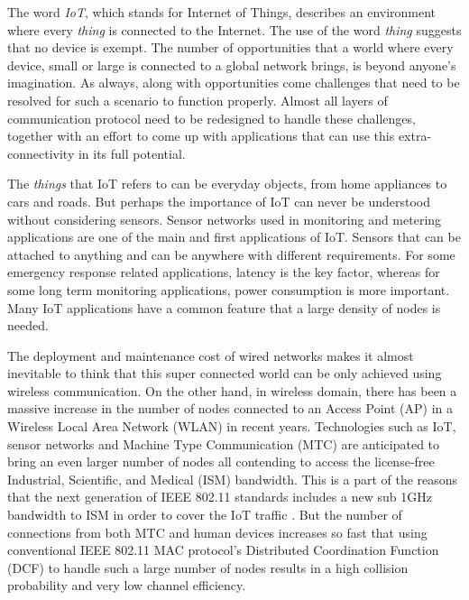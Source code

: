 \label{chapter:introduction}

The word \textit{IoT}, which stands for Internet of Things, describes an environment where every \textit{thing} is connected to the Internet. The use of the word \textit{thing} suggests that no device is exempt. The number of opportunities that a world where every device, small or large is connected to a global network brings, is beyond anyone's imagination. As always, along with opportunities come challenges that need to be resolved for such a scenario to function properly. Almost all layers of communication protocol need to be redesigned to handle these challenges, together with an effort to come up with applications that can use this extra-connectivity in its full potential.

The \textit{things} that IoT refers to can be everyday objects, from home appliances to cars and roads. But perhaps the importance of IoT can never be understood without considering sensors. Sensor networks used in monitoring and metering applications are one of the main and first applications of IoT. Sensors that can be attached to anything and can be anywhere with different requirements. For some emergency response related applications, latency is the key factor, whereas for some long term monitoring applications, power consumption is more important. Many IoT applications have a common feature that a large density of nodes is needed.


The deployment and maintenance cost of wired networks makes it almost inevitable to think that this super connected world can be only achieved using wireless communication. On the other hand, in wireless domain, there has been a massive increase in the number of nodes connected to an Access Point (AP) in a Wireless Local Area Network (WLAN) in recent years. Technologies such as IoT, sensor networks and Machine Type Communication (MTC) are anticipated to bring an even larger number of nodes all contending to access the license-free Industrial, Scientific, and Medical (ISM) bandwidth. This is a part of the reasons that the next generation of IEEE 802.11 standards includes a new sub 1GHz bandwidth to ISM in order to cover the IoT traffic \cite{Req80211ah}. But the number of connections from both MTC and human devices increases so fast that using conventional IEEE 802.11 MAC protocol's Distributed Coordination Function (DCF) to handle such a large number of nodes results in a high collision probability and very low channel efficiency.

